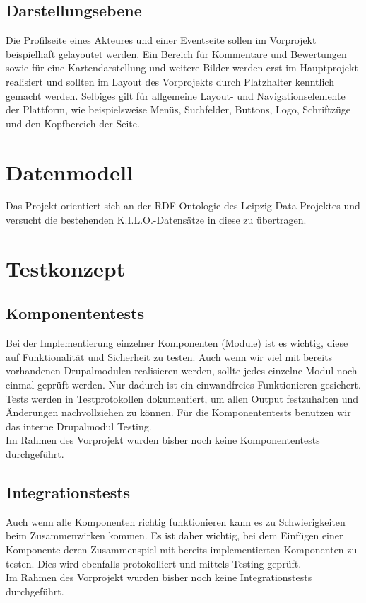 \documentclass{swp}
\begin{document}
\subsection{Darstellungsebene}
Die Profilseite eines Akteures und einer Eventseite sollen im Vorprojekt beispielhaft gelayoutet werden. Ein Bereich f\"ur Kommentare und Bewertungen sowie f\"ur eine Kartendarstellung und weitere Bilder werden erst im Hauptprojekt realisiert und sollten im Layout des Vorprojekts durch Platzhalter kenntlich gemacht werden. Selbiges gilt f\"ur allgemeine Layout- und Navigationselemente der Plattform, wie beispielsweise Men\"us, Suchfelder, Buttons, Logo, Schriftz\"uge und den Kopfbereich der Seite.

\section{Datenmodell}
Das Projekt orientiert sich an der RDF-Ontologie des Leipzig Data Projektes und versucht die bestehenden K.I.L.O.-Datens\"atze in diese zu \"ubertragen.

\section{Testkonzept}
\subsection{Komponententests}
Bei der Implementierung einzelner Komponenten (Module) ist es wichtig, diese auf Funktionalit\"at und Sicherheit zu testen. Auch wenn wir viel mit bereits vorhandenen Drupalmodulen realisieren werden, sollte jedes einzelne Modul noch einmal gepr\"uft werden. Nur dadurch ist ein einwandfreies Funktionieren gesichert. Tests werden in Testprotokollen dokumentiert, um allen Output festzuhalten und \"Anderungen nachvollziehen zu k\"onnen. F\"ur die Komponententests benutzen wir das interne Drupalmodul \glqq Testing\grqq{}. \\
Im Rahmen des Vorprojekt wurden bisher noch keine Komponententests durchgef\"uhrt.
\subsection{Integrationstests}
Auch wenn alle Komponenten richtig funktionieren kann es zu Schwierigkeiten beim Zusammenwirken kommen. Es ist daher wichtig, bei dem Einf\"ugen einer Komponente deren Zusammenspiel mit bereits implementierten Komponenten zu testen. Dies wird ebenfalls protokolliert und mittels \glqq Testing\grqq{} gepr\"uft.\\
Im Rahmen des Vorprojekt wurden bisher noch keine Integrationstests durchgef\"uhrt.
\end{document}
